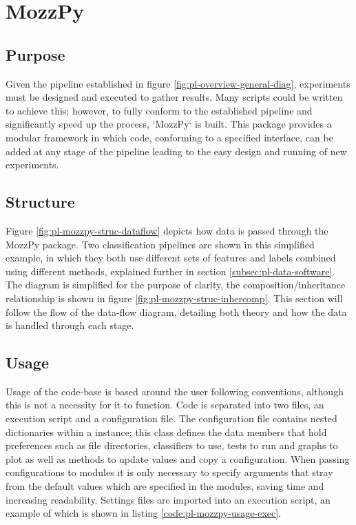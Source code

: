 \section{MozzPy}
\label{sec:pl-mozzpy}
    \subsection{Purpose}
    \label{subsec:pl-mozzpy-purp}
        Given the pipeline established in figure \ref{fig:pl-overview-general-diag}, experiments must be designed and executed to gather results. Many scripts could be written to achieve this; however, to fully conform to the established pipeline and significantly speed up the process, `MozzPy` is built. This package provides a modular framework in which code, conforming to a specified interface, can be added at any stage of the pipeline leading to the easy design and running of new experiments.
    
    \subsection{Structure}
    \label{subsec:pl-mozzpy-struc}
        
        
        Figure \ref{fig:pl-mozzpy-struc-dataflow} depicts how data is passed through the MozzPy package. Two classification pipelines are shown in this simplified example, in which they both use different sets of features and labels combined using different methods, explained further in section \ref{subsec:pl-data-software}. The diagram is simplified for the purpose of clarity, the composition/inheritance relationship is shown in figure \ref{fig:pl-mozzpy-struc-inhercomp}. This section will follow the flow of the data-flow diagram, detailing both theory and how the data is handled through each stage.
  
        
    
    \subsection{Usage}
    \label{subsec:pl-mozzpy-usage}
        Usage of the code-base is based around the user following conventions, although this is not a necessity for it to function. Code is separated into two files, an execution script and a configuration file. The configuration file contains nested dictionaries within a  instance; this class defines the data members that hold preferences such as file directories, classifiers to use, tests to run and graphs to plot as well as methods to update values and copy a configuration. When passing configurations to modules it is only necessary to specify arguments that stray from the default values which are specified in the modules, saving time and increasing readability. Settings files are imported into an execution script, an example of which is shown in listing \ref{code:pl-mozzpy-usage-exec}.

